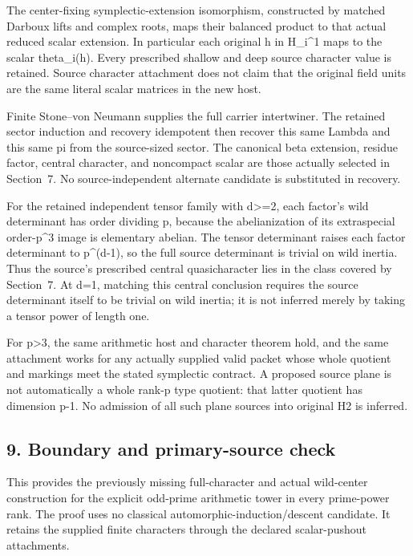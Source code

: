 The center-fixing symplectic-extension isomorphism, constructed by
matched Darboux lifts and complex roots, maps their balanced product to
that actual reduced scalar extension. In particular each original h in
H\_i\^{}1 maps to the scalar theta\_i(h). Every prescribed shallow and
deep source character value is retained. Source character attachment
does not claim that the original field units are the same literal scalar
matrices in the new host.

Finite Stone--von Neumann supplies the full carrier intertwiner. The
retained sector induction and recovery idempotent then recover this same
Lambda and this same pi from the source-sized sector. The canonical beta
extension, residue factor, central character, and noncompact scalar are
those actually selected in Section~7. No source-independent alternate
candidate is substituted in recovery.

For the retained independent tensor family with d\textgreater=2, each
factor's wild determinant has order dividing p, because the
abelianization of its extraspecial order-p\^{}3 image is elementary
abelian. The tensor determinant raises each factor determinant to
p\^{}(d-1), so the full source determinant is trivial on wild inertia.
Thus the source's prescribed central quasicharacter lies in the class
covered by Section~7. At d=1, matching this central conclusion requires
the source determinant itself to be trivial on wild inertia; it is not
inferred merely by taking a tensor power of length one.

For p\textgreater3, the same arithmetic host and character theorem hold,
and the same attachment works for any actually supplied valid packet
whose whole quotient and markings meet the stated symplectic contract. A
proposed source plane is not automatically a whole rank-p type quotient:
that latter quotient has dimension p-1. No admission of all such plane
sources into original H2 is inferred.

\hypertarget{odd_character-boundary-and-primary-source-check}{%
\subsection{9. Boundary and primary-source
check}\label{odd_character-boundary-and-primary-source-check}}

This provides the previously missing full-character and actual
wild-center construction for the explicit odd-prime arithmetic tower in
every prime-power rank. The proof uses no classical
automorphic-induction/descent candidate. It retains the supplied finite
characters through the declared scalar-pushout attachments.

